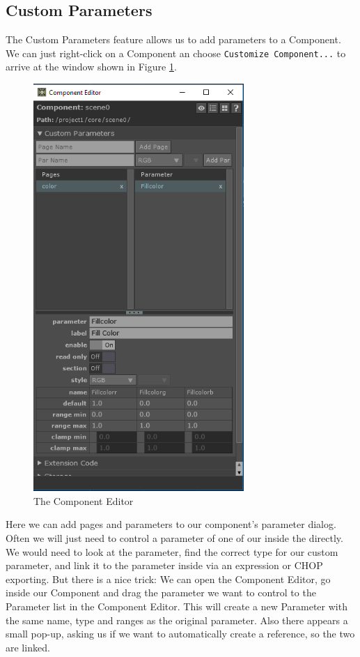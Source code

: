 \subsection{Custom Parameters}
The Custom Parameters feature allows us to add parameters to a Component. We can just right-click on a Component an choose \texttt{Customize Component...} to arrive at the window shown in Figure \ref{fig:customizeComponent}.

\begin{figure}[H]
	\centering
	\includegraphics[width=8cm]{img/customizeComponent.PNG}
	\caption[customize component]
	{The Component Editor}
	\label{fig:customizeComponent}
\end{figure}

Here we can add pages and parameters to our component's parameter dialog.\\
Often we will just need to control a parameter of one of our \OPs inside the \COMP directly. We would need to look at the parameter, find the correct type for our custom parameter, and link it to the parameter inside via an expression or CHOP exporting. But there is a nice trick:
We can open the Component Editor, go inside our Component and drag the parameter we want to control to the Parameter list in the Component Editor. This will create a new Parameter with the same name, type and ranges as the original parameter. Also there appears a small pop-up, asking us if we want to automatically create a reference, so the two are linked.

